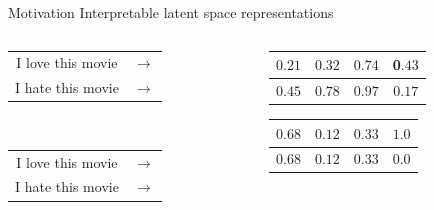 \documentclass{beamer}
\begin{document}
\begin{frame}{Motivation}
  \centering
  {\LARGE Interpretable latent space representations} \\
  \vspace{1cm}
  \begin{columns}[T] %
    \begin{column}{.3\textwidth}
      \centering
      \begin{tabular}{ c c }
        I love this movie & $\rightarrow$ \\
        I hate this movie & $\rightarrow$ \\
      \end{tabular} \\
      \vspace{1.8cm}
      {\color{white} \begin{tabular}{ c c }
        I love this movie & $\rightarrow$ \\
        I hate this movie & $\rightarrow$ \\
      \end{tabular}}
    \end{column}
    \hfill
    \begin{column}{.6\textwidth}
      \centering
      \begin{tabular}{ | c | c | c | c | }
        \hline
        $0.21$ & $0.32$ & $0.74$ & 0$.43$ \\
        \hline
        $0.45$ & $0.78$ & $0.97$ & 0$.17$ \\
        \hline
      \end{tabular}
      {\color{white}{\Huge$$\Downarrow$$}
      \begin{tabular}{ | c | c | c | c | }
        \hline
        $0.68$ & $0.12$ & $0.33$ & $1.0$ \\
        \hline
        \hline
        $0.68$ & $0.12$ & $0.33$ & $0.0$ \\
        \hline
      \end{tabular}}
    \end{column}
  \end{columns}
\end{frame}
\end{document}

